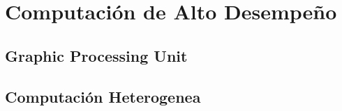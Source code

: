 \section{Computación de Alto Desempeño}
\subsection{Graphic Processing Unit}
\subsection{Computación Heterogenea}
